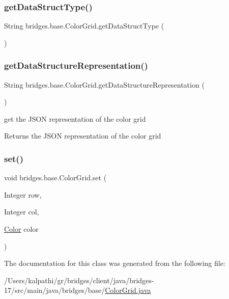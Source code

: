 \subsubsection{\texorpdfstring{get\+Data\+Struct\+Type()}{getDataStructType()}}
{\footnotesize\ttfamily String bridges.\+base.\+Color\+Grid.\+get\+Data\+Struct\+Type (\begin{DoxyParamCaption}{ }\end{DoxyParamCaption})}

\mbox{\label{classbridges_1_1base_1_1_color_grid_a81ca0995d17b6cb31122b718dfa57286}} 
\subsubsection{\texorpdfstring{get\+Data\+Structure\+Representation()}{getDataStructureRepresentation()}}
{\footnotesize\ttfamily String bridges.\+base.\+Color\+Grid.\+get\+Data\+Structure\+Representation (\begin{DoxyParamCaption}{ }\end{DoxyParamCaption})}

get the J\+S\+ON representation of the color grid

\begin{DoxyReturn}{Returns}
the J\+S\+ON representation of the color grid 
\end{DoxyReturn}
\mbox{\label{classbridges_1_1base_1_1_color_grid_a93b29af9bb21b2bf6e52bc3fda9ff34a}} 
\subsubsection{\texorpdfstring{set()}{set()}}
{\footnotesize\ttfamily void bridges.\+base.\+Color\+Grid.\+set (\begin{DoxyParamCaption}\item[{Integer}]{row,  }\item[{Integer}]{col,  }\item[{\mbox{\hyperlink{classbridges_1_1base_1_1_color}{Color}}}]{color }\end{DoxyParamCaption})}



The documentation for this class was generated from the following file\+:\begin{DoxyCompactItemize}
\item 
/\+Users/kalpathi/gr/bridges/client/java/bridges-\/17/src/main/java/bridges/base/\mbox{\hyperlink{_color_grid_8java}{Color\+Grid.\+java}}\end{DoxyCompactItemize}
